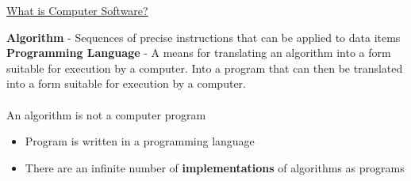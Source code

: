 \documentclass{article}[18pt]
\begin{document}
\begin{center}
\underline{\huge What is Computer Software?}
\end{center}
\textbf{Algorithm} - Sequences of precise instructions that can be applied to data items\\
\textbf{Programming Language}  - A means for translating an algorithm into a form suitable for execution by a computer. Into a program that can then be translated into a form suitable for execution by a computer.\\
\\
An algorithm is not a computer program
\begin{itemize}
\item Program is written in a programming language
\item There are an infinite number of \textbf{implementations} of algorithms as programs
\end{itemize}
\end{document}
